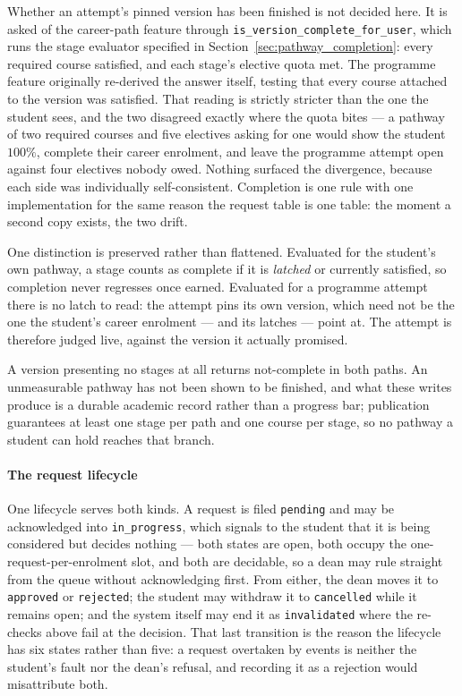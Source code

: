 Whether an attempt's pinned version has been finished is not decided here. It is asked of the career-path feature through \texttt{is\_version\_complete\_for\_user}, which runs the stage evaluator specified in Section~\ref{sec:pathway_completion}: every required course satisfied, and each stage's elective quota met. The programme feature originally re-derived the answer itself, testing that every course attached to the version was satisfied. That reading is strictly stricter than the one the student sees, and the two disagreed exactly where the quota bites --- a pathway of two required courses and five electives asking for one would show the student $100\%$, complete their career enrolment, and leave the programme attempt open against four electives nobody owed. Nothing surfaced the divergence, because each side was individually self-consistent. Completion is one rule with one implementation for the same reason the request table is one table: the moment a second copy exists, the two drift.

One distinction is preserved rather than flattened. Evaluated for the student's own pathway, a stage counts as complete if it is \emph{latched} or currently satisfied, so completion never regresses once earned. Evaluated for a programme attempt there is no latch to read: the attempt pins its own version, which need not be the one the student's career enrolment --- and its latches --- point at. The attempt is therefore judged live, against the version it actually promised.

A version presenting no stages at all returns not-complete in both paths. An unmeasurable pathway has not been shown to be finished, and what these writes produce is a durable academic record rather than a progress bar; publication guarantees at least one stage per path and one course per stage, so no pathway a student can hold reaches that branch.

\paragraph{The request lifecycle}
One lifecycle serves both kinds. A request is filed \texttt{pending} and may be acknowledged into \texttt{in\_progress}, which signals to the student that it is being considered but decides nothing --- both states are open, both occupy the one-request-per-enrolment slot, and both are decidable, so a dean may rule straight from the queue without acknowledging first. From either, the dean moves it to \texttt{approved} or \texttt{rejected}; the student may withdraw it to \texttt{cancelled} while it remains open; and the system itself may end it as \texttt{invalidated} where the re-checks above fail at the decision. That last transition is the reason the lifecycle has six states rather than five: a request overtaken by events is neither the student's fault nor the dean's refusal, and recording it as a rejection would misattribute both.

